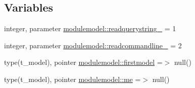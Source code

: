 \subsection*{Variables}
\begin{DoxyCompactItemize}
\item 
integer, parameter \mbox{\hyperlink{namespacemodulemodel_a9d28e193fe25ac78b7f97d328ea3d7f4}{modulemodel\+::readquerystring\+\_\+}} = 1
\item 
integer, parameter \mbox{\hyperlink{namespacemodulemodel_a58d33da3b782f55628340bd21722de76}{modulemodel\+::readcommandline\+\_\+}} = 2
\item 
type(t\+\_\+model), pointer \mbox{\hyperlink{namespacemodulemodel_ac561b0a5644fa2248aaefbf844e5a4aa}{modulemodel\+::firstmodel}} =$>$ null()
\item 
type(t\+\_\+model), pointer \mbox{\hyperlink{namespacemodulemodel_a98337e796a74b39490b015ac045f4570}{modulemodel\+::me}} =$>$ null()
\end{DoxyCompactItemize}
